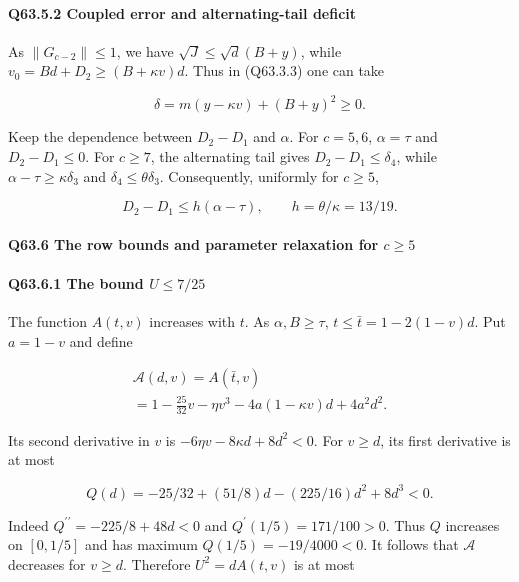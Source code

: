 \paragraph{Q63.5.2 Coupled error and alternating-tail deficit}

As $\|G_{c-2}\|\le\allowbreak 1$, we have $\sqrt J\le\allowbreak \sqrt d(B+y)$, while
$v_0=\allowbreak Bd+D_2\ge\allowbreak (B+\kappa v)d$. Thus in (Q63.3.3) one can take

\[
\delta=m(y-\kappa v)+(B+y)^2\ge0.
\tag{Q63.5.3}\label{eq:Q63:Q63:5:3}
\]

Keep the dependence between $D_2-D_1$ and $\alpha$. For $c=\allowbreak 5,\allowbreak  6$, $\alpha=\allowbreak \tau$ and $D_2-D_1\le\allowbreak 0$.
For $c\ge\allowbreak 7$, the alternating tail gives $D_2-D_1\le\allowbreak  \delta_4$, while $\alpha-\tau\ge\allowbreak \kappa \delta_3$ and $\delta_4\le\allowbreak \theta \delta_3$.
Consequently, uniformly for $c\ge\allowbreak 5$,

\[
D_2-D_1\le h(\alpha-\tau),\qquad h=\theta/\kappa=13/19.
\tag{Q63.5.4}\label{eq:Q63:Q63:5:4}
\]



\paragraph{Q63.6 The row bounds and parameter relaxation for $c\ge\allowbreak 5$}

\paragraph{Q63.6.1 The bound $U\le\allowbreak 7/25$}

The function $A(t,\allowbreak  v)$ increases with $t$. As $\alpha,\allowbreak  B\ge\allowbreak \tau$,
$t\le\allowbreak \bar t=\allowbreak 1-2(1-v)d$. Put $a=\allowbreak 1-v$ and define

\[
\begin{gathered}
\mathcal A(d,v)=A(\bar t,v)\\
=1-\frac{25}{32}v-\eta v^3-4a(1-\kappa v)d+4a^2d^2.
\end{gathered}\tag{Q63.6.1}\label{eq:Q63:Q63:6:1}
\]

Its second derivative in $v$ is $-6\eta v-8\kappa d+8d^2<\allowbreak 0$. For $v\ge\allowbreak  d$, its first derivative is at most

\[
Q(d)=-25/32+(51/8)d-(225/16)d^2+8d^3<0.
\]

Indeed $Q^{\prime\prime}=\allowbreak -225/8+48d<\allowbreak 0$ and $Q^\prime(1/5)=\allowbreak 171/100>\allowbreak 0$.
Thus $Q$ increases on $[0,\allowbreak  1/5]$ and has maximum $Q(1/5)=\allowbreak -19/4000<\allowbreak 0$.
It follows that $\mathcal A$ decreases for $v\ge\allowbreak  d$. Therefore $U^2=\allowbreak dA(t,\allowbreak  v)$ is at most

